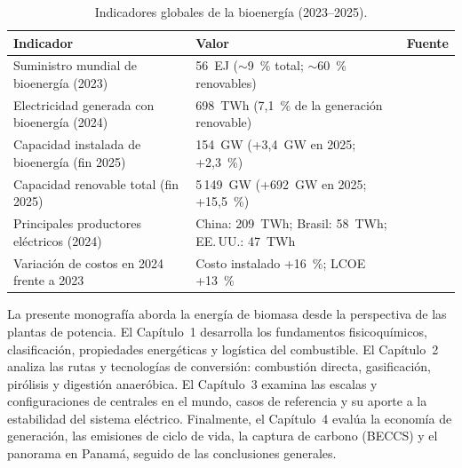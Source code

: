 \begin{table}[h!]
\centering
\footnotesize
\caption{Indicadores globales de la bioenergía (2023--2025).}
\label{tab:biomasa_cifras}
\begin{tabularx}{\textwidth}{@{}X l l@{}}
\toprule
\textbf{Indicador} & \textbf{Valor} & \textbf{Fuente} \\
\midrule
Suministro mundial de bioenergía (2023) & 56~EJ ($\sim$9~\% total; $\sim$60~\% renovables) & \cite{wba2025gbsr} \\
Electricidad generada con bioenergía (2024) & 698~TWh (7,1~\% de la generación renovable) & \cite{wba2025gbsr} \\
Capacidad instalada de bioenergía (fin 2025) & 154~GW (+3,4~GW en 2025; +2,3~\%) & \cite{irena2026capacity} \\
Capacidad renovable total (fin 2025) & 5\,149~GW (+692~GW en 2025; +15,5~\%) & \cite{irena2026capacity} \\
Principales productores eléctricos (2024) & China: 209~TWh; Brasil: 58~TWh; EE.\,UU.: 47~TWh & \cite{wba2025gbsr} \\
Variación de costos en 2024 frente a 2023 & Costo instalado +16~\%; LCOE +13~\% & \cite{irena2025costs} \\
\bottomrule
\end{tabularx}
\end{table}

La presente monografía aborda la energía de biomasa desde la perspectiva de las plantas de potencia. El Capítulo~1 desarrolla los fundamentos fisicoquímicos, clasificación, propiedades energéticas y logística del combustible. El Capítulo~2 analiza las rutas y tecnologías de conversión: combustión directa, gasificación, pirólisis y digestión anaeróbica. El Capítulo~3 examina las escalas y configuraciones de centrales en el mundo, casos de referencia y su aporte a la estabilidad del sistema eléctrico. Finalmente, el Capítulo~4 evalúa la economía de generación, las emisiones de ciclo de vida, la captura de carbono (BECCS) y el panorama en Panamá, seguido de las conclusiones generales.

\clearpage
